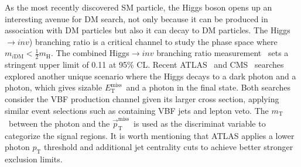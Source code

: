 \documentclass{moriond}
\def\mt{m_{\textrm{T}}}
\def\et{E_\textrm{T}^{\textrm{miss}}}
\def\ptmiss{\vec{p}_\textrm{T}^{\textrm{miss}}}
\begin{document}
As the most recently discovered SM particle, the Higgs boson opens up an
interesting avenue for DM search, not only because it can be produced in
association with DM particles but also it can decay to DM particles. The
Higgs$\rightarrow inv$) branching ratio is a critical channel to study the
phase space where $m_{i\textrm{DM}} < \frac{1}{2}m_{\textrm{H}}$. The combined
Higgs$\rightarrow inv$ branching ratio measurement~\cite{hiv} sets a stringent
upper limit of 0.11 at 95\% CL. Recent ATLAS~\cite{atlasvbf} and
CMS~\cite{cmsvbf} searches explored another unique scenario where the Higgs
decays to a dark photon and a photon, which gives sizable $\et$\ and a photon
in the final state. Both searches consider the VBF production channel given its
larger cross section, applying similar event selections such as containing VBF
jets and lepton veto. The $\mt$\ between the photon and the $\ptmiss$\ is used
as the discriminat variable to categorize the signal regions. It is worth
mentioning that ATLAS applies a lower photon $p_{\textrm{T}}$ threshold and
additional jet centrality cuts to achieve better stronger exclusion limits.  
\end{document}
